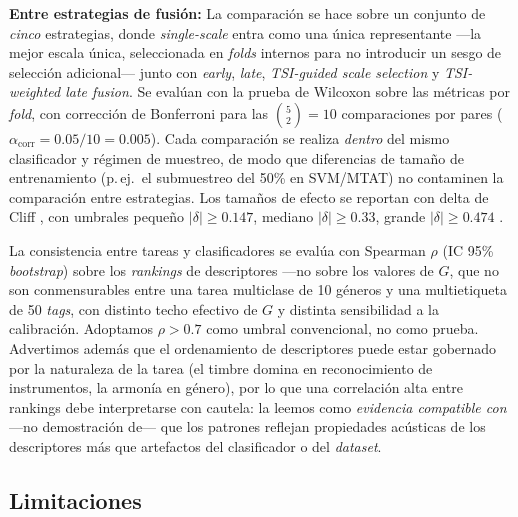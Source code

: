 \documentclass[conference]{IEEEtran}
\begin{document}
\textbf{Entre estrategias de fusión:} La comparación se hace sobre un conjunto de \emph{cinco} estrategias, donde \textit{single-scale} entra como una única representante ---la mejor escala única, seleccionada en \textit{folds} internos para no introducir un sesgo de selección adicional--- junto con \textit{early}, \textit{late}, \textit{TSI-guided scale selection} y \textit{TSI-weighted late fusion}. Se evalúan con la prueba de Wilcoxon sobre las métricas por \textit{fold}, con corrección de Bonferroni para las $\binom{5}{2}=10$ comparaciones por pares ($\alpha_{\text{corr}}=0.05/10=0.005$). Cada comparación se realiza \emph{dentro} del mismo clasificador y régimen de muestreo, de modo que diferencias de tamaño de entrenamiento (p.\,ej.\ el submuestreo del 50\% en SVM/MTAT) no contaminen la comparación entre estrategias. Los tamaños de efecto se reportan con delta de Cliff \cite{cliff1993dominance}, con umbrales pequeño $|\delta|\geq 0.147$, mediano $|\delta|\geq 0.33$, grande $|\delta|\geq 0.474$ \cite{romano2006exploring}.


La consistencia entre tareas y clasificadores se evalúa con Spearman $\rho$ (IC 95\% \textit{bootstrap}) sobre los \emph{rankings} de descriptores ---no sobre los valores de $G$, que no son conmensurables entre una tarea multiclase de 10 géneros y una multietiqueta de 50 \textit{tags}, con distinto techo efectivo de $G$ y distinta sensibilidad a la calibración. Adoptamos $\rho>0.7$ como umbral convencional, no como prueba. Advertimos además que el ordenamiento de descriptores puede estar gobernado por la naturaleza de la tarea (el timbre domina en reconocimiento de instrumentos, la armonía en género), por lo que una correlación alta entre rankings debe interpretarse con cautela: la leemos como \emph{evidencia compatible con} ---no demostración de--- que los patrones reflejan propiedades acústicas de los descriptores más que artefactos del clasificador o del \textit{dataset}.


\subsection{Limitaciones}
\end{document}
